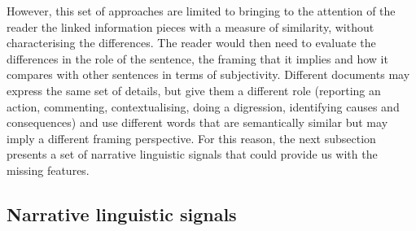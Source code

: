 However, this set of approaches are limited to bringing to the attention of the reader the linked information pieces with a measure of similarity, without characterising the differences. The reader would then need to evaluate the differences in the role of the sentence, the framing that it implies and how it compares with other sentences in terms of subjectivity.
Different documents may express the same set of details, but give them a different role (reporting an action, commenting, contextualising, doing a digression, identifying causes and consequences) and use different words that are semantically similar but may imply a different framing perspective.
For this reason, the next subsection presents a set of narrative linguistic signals that could provide us with the missing features.



\subsection{Narrative linguistic signals}

